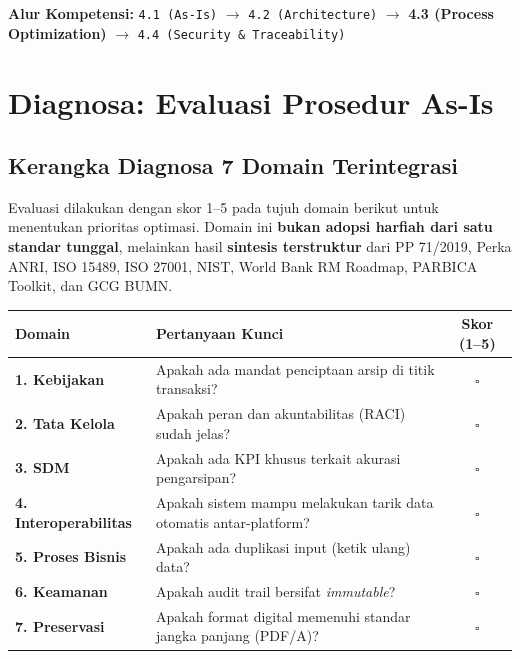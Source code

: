 \documentclass[11pt,a4paper]{article}
\begin{document}
\textbf{Alur Kompetensi:} \texttt{4.1 (As-Is)} $\rightarrow$ \texttt{4.2 (Architecture)} $\rightarrow$ \textbf{4.3 (Process Optimization)} $\rightarrow$ \texttt{4.4 (Security \& Traceability)}

\newpage

\section{Diagnosa: Evaluasi Prosedur As-Is}

\subsection{Kerangka Diagnosa 7 Domain Terintegrasi}
Evaluasi dilakukan dengan skor 1--5 pada tujuh domain berikut untuk menentukan prioritas optimasi. Domain ini \textbf{bukan adopsi harfiah dari satu standar tunggal}, melainkan hasil \textbf{sintesis terstruktur} dari PP 71/2019, Perka ANRI, ISO 15489, ISO 27001, NIST, World Bank RM Roadmap, PARBICA Toolkit, dan GCG BUMN.

\begin{table}[h!]
\centering\small
\begin{tabularx}{\textwidth}{@{} l X c @{}}
\toprule
\textbf{Domain} & \textbf{Pertanyaan Kunci} & \textbf{Skor (1--5)} \\
\midrule
\rowcolor{plnblue!5}
\textbf{1. Kebijakan} & Apakah ada mandat penciptaan arsip di titik transaksi? & $\square$ \\
\textbf{2. Tata Kelola} & Apakah peran dan akuntabilitas (RACI) sudah jelas? & $\square$ \\
\rowcolor{plnblue!5}
\textbf{3. SDM} & Apakah ada KPI khusus terkait akurasi pengarsipan? & $\square$ \\
\textbf{4. Interoperabilitas} & Apakah sistem mampu melakukan tarik data otomatis antar-platform? & $\square$ \\
\rowcolor{plnblue!5}
\textbf{5. Proses Bisnis} & Apakah ada duplikasi input (ketik ulang) data? & $\square$ \\
\textbf{6. Keamanan} & Apakah audit trail bersifat \textit{immutable}? & $\square$ \\
\rowcolor{plnblue!5}
\textbf{7. Preservasi} & Apakah format digital memenuhi standar jangka panjang (PDF/A)? & $\square$ \\
\bottomrule
\end{tabularx}
\end{table}
\end{document}
